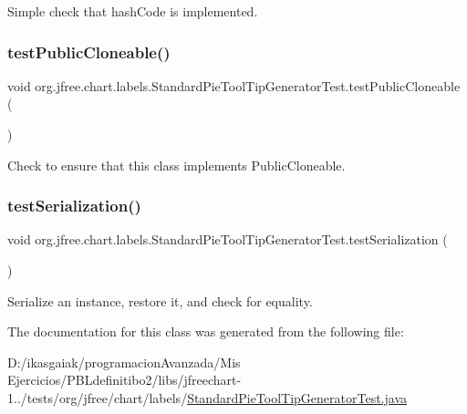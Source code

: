 Simple check that hash\+Code is implemented. \mbox{\label{classorg_1_1jfree_1_1chart_1_1labels_1_1_standard_pie_tool_tip_generator_test_a775d78abd090b4ffc8eaab0b339d2da1}} 
\subsubsection{\texorpdfstring{test\+Public\+Cloneable()}{testPublicCloneable()}}
{\footnotesize\ttfamily void org.\+jfree.\+chart.\+labels.\+Standard\+Pie\+Tool\+Tip\+Generator\+Test.\+test\+Public\+Cloneable (\begin{DoxyParamCaption}{ }\end{DoxyParamCaption})}

Check to ensure that this class implements Public\+Cloneable. \mbox{\label{classorg_1_1jfree_1_1chart_1_1labels_1_1_standard_pie_tool_tip_generator_test_a4a8cb1a0a7f4e1850928ca0cf50637fa}} 
\subsubsection{\texorpdfstring{test\+Serialization()}{testSerialization()}}
{\footnotesize\ttfamily void org.\+jfree.\+chart.\+labels.\+Standard\+Pie\+Tool\+Tip\+Generator\+Test.\+test\+Serialization (\begin{DoxyParamCaption}{ }\end{DoxyParamCaption})}

Serialize an instance, restore it, and check for equality. 

The documentation for this class was generated from the following file\+:\begin{DoxyCompactItemize}
\item 
D\+:/ikasgaiak/programacion\+Avanzada/\+Mis Ejercicios/\+P\+B\+Ldefinitibo2/libs/jfreechart-\/1../tests/org/jfree/chart/labels/\mbox{\hyperlink{_standard_pie_tool_tip_generator_test_8java}{Standard\+Pie\+Tool\+Tip\+Generator\+Test.\+java}}\end{DoxyCompactItemize}
